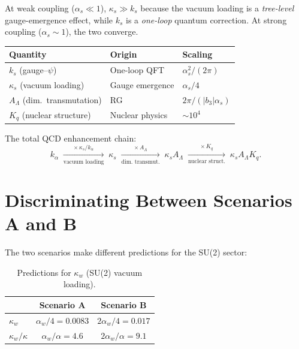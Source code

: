 \documentclass[11pt,letterpaper]{article}
\newcommand{\alphafine}{\alpha}
\newcommand{\kalpha}{k_\alpha}
\theoremstyle{definition}
\begin{document}
At weak coupling ($\alpha_s \ll 1$), $\kappa_s \gg k_s$ because
the vacuum loading is a \emph{tree-level} gauge-emergence effect,
while $k_s$ is a \emph{one-loop} quantum correction.  At strong
coupling ($\alpha_s \sim 1$), the two converge.

\begin{tcolorbox}[colback=blue!5!white, colframe=blue!50!black,
title=Physical Picture]
\begin{center}
\begin{tabular}{lll}
\toprule
Quantity & Origin & Scaling \\
\midrule
$k_s$ (gauge--$\psi$) & One-loop QFT & $\alpha_s^2/(2\pi)$ \\
$\kappa_s$ (vacuum loading) & Gauge emergence & $\alpha_s/4$ \\
$A_\Lambda$ (dim.\ transmutation) & RG & $2\pi/(|b_3|\alpha_s)$ \\
$K_q$ (nuclear structure) & Nuclear physics & $\sim 10^4$ \\
\bottomrule
\end{tabular}
\end{center}

The total QCD enhancement chain:
\begin{equation}
\kalpha \;\xrightarrow[\text{vacuum loading}]{\times\,\kappa_s/\kalpha}\;
\kappa_s \;\xrightarrow[\text{dim.\ transmut.}]{\times\,A_\Lambda}\;
\kappa_s A_\Lambda \;\xrightarrow[\text{nuclear struct.}]{\times\,K_q}\;
\kappa_s A_\Lambda K_q.
\end{equation}
\end{tcolorbox}

\section{Discriminating Between Scenarios A and B}\label{sec:discriminate}

The two scenarios make different predictions for the SU(2) sector:

\begin{table}[h]
\centering
\caption{Predictions for $\kappa_w$ (SU(2) vacuum
loading).}\label{tab:SU2}
\renewcommand{\arraystretch}{1.3}
\begin{tabular}{lcc}
\toprule
& Scenario A & Scenario B \\
\midrule
$\kappa_w$ & $\alpha_w/4 = 0.0083$ & $2\alpha_w/4 = 0.017$ \\
$\kappa_w/\kappa$ & $\alpha_w/\alphafine = 4.6$ & $2\alpha_w/\alphafine = 9.1$ \\
\bottomrule
\end{tabular}
\end{table}
\end{document}
